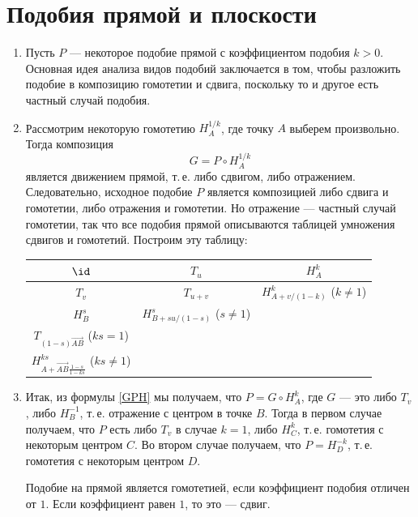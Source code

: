 \section{Подобия прямой и плоскости}




\begin{enumerate}

\item Пусть $P$ --- некоторое подобие прямой с коэффициентом подобия $k>0$. Основная идея анализа видов подобий заключается в том, чтобы разложить подобие в композицию гомотетии и сдвига, поскольку то и другое есть частный случай подобия.
\item Рассмотрим некоторую гомотетию $H_A^{1/k}$, где точку $A$ выберем произвольно. Тогда композиция
\begin{equation}\label{GPH}
G = P\circ H_A^{1/k}
\end{equation}
является движением прямой, т.\,е. либо сдвигом, либо отражением. Следовательно, исходное подобие $P$ является композицией либо сдвига и гомотетии, либо отражения и гомотетии. Но отражение --- частный случай гомотетии, так что все подобия прямой описываются таблицей умножения сдвигов и гомотетий. Построим эту таблицу:
\begin{center}\Large
\begin{tabular}{c|c|c|}
$\id$    & $T_u$    &   $H_A^k$  \\ \hline
$T_v$    & $T_{u+v}$ & $\displaystyle H_{A+v/(1-k)}^k$ ($k\ne 1$) \\ \hline
$H_B^s$  &  $\displaystyle H_{B+su/(1-s)}^s$ ($s\ne 1$)  & \specialcell{ $H_{A}^{ks}$ ($A=B$) \\[2pt]
$\displaystyle T_{(1-s)\vec{AB}}$ ($ks=1$) \\[4pt]  $\displaystyle H_{A+\vec{AB}\frac{1-s}{1-ks}}^{ks}$ ($ks\ne 1$) } \\ \hline
\end{tabular}
\end{center}
\item Итак, из формулы \eqref{GPH} мы получаем, что $P=G\circ H_A^k$, где $G$ --- это либо $T_v$, либо $H_B^{-1}$, т.\,е. отражение с центром в точке $B$. Тогда в первом случае получаем, что $P$ есть либо $T_v$ в случае $k=1$, либо $H_C^k$, т.\,е. гомотетия с некоторым центром $C$. Во втором случае получаем, что $P=H_D^{-k}$, т.\,е. гомотетия с некоторым центром $D$.
\begin{thrm}
Подобие на прямой является гомотетией, если коэффициент подобия отличен от $1$. Если коэффициент равен $1$, то это --- сдвиг.
\end{thrm}




\end{enumerate}
